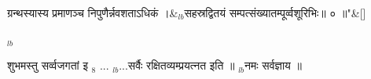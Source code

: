 \documentclass[article,12pt,a4paper]{memoir}%
\newcounter{parCount}
\begin{document}
	    
	    \stanza[\smallbreak]
	  ग्रन्थस्यास्य प्रमाणञ्च निपुणैर्न्नवशताऽधिकं ।&{\tiny $_{lb}$}सहस्रद्वितयं सम्पत्संख्यातम्पूर्व्वशूरिभिः॥ ० ॥{\normalfontlatin\large\qquad{}"}\&[\smallbreak]
	  
	  
	  
	  \endgroup
	{\tiny $_{lb}$}

	  
	  \pstart \leavevmode%
	शुभमस्तु सर्व्वजगतां इ {\tiny $_{8}$} ... {\tiny $_{lb}$}...सर्वैः रक्षितव्यम्प्रयत्नत इति ॥ {\tiny $_{lb}$}नमः सर्वज्ञाय ॥ 
	{}
	\pend%
      
	    
	    \endnumbering%
	    
     \backmatter 
\end{document}
